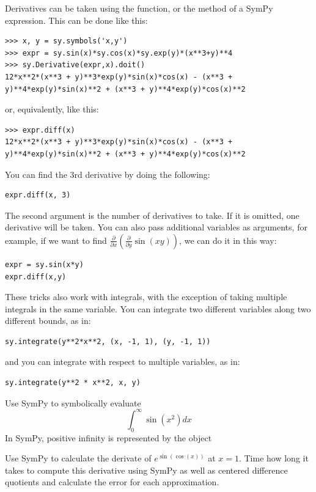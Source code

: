 Derivatives can be taken using the  function, or the  method of a SymPy expression.
This can be done like this:
\begin{lstlisting}
>>> x, y = sy.symbols('x,y')
>>> expr = sy.sin(x)*sy.cos(x)*sy.exp(y)*(x**3+y)**4
>>> sy.Derivative(expr,x).doit()
12*x**2*(x**3 + y)**3*exp(y)*sin(x)*cos(x) - (x**3 + y)**4*exp(y)*sin(x)**2 + (x**3 + y)**4*exp(y)*cos(x)**2
\end{lstlisting}
or, equivalently, like this:
\begin{lstlisting}
>>> expr.diff(x)
12*x**2*(x**3 + y)**3*exp(y)*sin(x)*cos(x) - (x**3 + y)**4*exp(y)*sin(x)**2 + (x**3 + y)**4*exp(y)*cos(x)**2
\end{lstlisting}
You can find the 3rd derivative by doing the following:
\begin{lstlisting}
expr.diff(x, 3)
\end{lstlisting}
The second argument is the number of derivatives to take.
If it is omitted, one derivative will be taken.
You can also pass additional variables as arguments, for example, if we want to find $\frac{\partial}{\partial x} \left( \frac{\partial}{\partial y}\sin\left(x y\right)\right)$, we can do it in this way:
\begin{lstlisting}
expr = sy.sin(x*y)
expr.diff(x,y)
\end{lstlisting}
These tricks also work with integrals, with the exception of taking multiple integrals in the same variable.
You can integrate two different variables along two different bounds, as in:
\begin{lstlisting}
sy.integrate(y**2*x**2, (x, -1, 1), (y, -1, 1))
\end{lstlisting}
and you can integrate with respect to multiple variables, as in:
\begin{lstlisting}
sy.integrate(y**2 * x**2, x, y)
\end{lstlisting}


\begin{problem}
Use SymPy to symbolically evaluate
\begin{equation*}
\int_0^\infty \sin\left(x^2\right) dx
\end{equation*}
In SymPy, positive infinity is represented by the object 
\end{problem}

\begin{problem}
Use SymPy to calculate the derivate of $e^{\sin\left(\cos\left(x\right)\right)}$ at $x=1$.  Time how long it takes to compute this derivative using SymPy as well as centered difference quotients and calculate the error for each approximation.
\end{problem}

